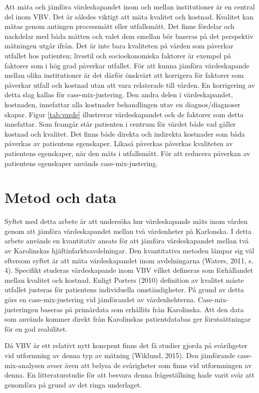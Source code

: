 Att mäta och jämföra värdeskapandet inom och mellan institutioner är en central del inom VBV. Det är således viktigt att mäta kvalitet och kostnad. Kvalitet kan mätas genom antingen processmått eller utfallsmått. Det finns fördelar och nackdelar med båda måtten och valet dem emellan bör baseras på det perspektiv mätningen utgår ifrån. Det är inte bara kvaliteten på vården som påverkar utfallet hos patienten; livsstil och socioekonomiska faktorer är exempel på faktorer som i hög grad påverkar utfallet. För att kunna jämföra värdeskapande mellan olika institutioner är det därför önskvärt att korrigera för faktorer som påverkar utfall och kostnad utan att vara relaterade till vården. En korrigering av detta slag kallas för case-mix-justering. Den andra delen i värdeskapandet, kostnaden, innefattar alla kostnader behandlingen utav en diagnos/diagnoser skapar. Figur \ref{tab:varde} illustrerar värdeskapandet och de faktorer som detta innefattar. Som framgår står patienten i centrum för värdet både vad gäller kostnad och kvalitet. Det finns både direkta och indirekta kostnader som båda påverkas av patientens egenskaper. Likaså påverkas påverkas kvaliteten av patientens egenskaper, när den mäts i utfallsmått. För att reducera påverkan av patientens egenskaper används case-mix-justering.


\section{Metod och data}

Syftet med detta arbete är att undersöka hur värdeskapande mäts inom vården genom att jämföra värdeskapandet mellan två vårdenheter på Karlonska. I detta arbete används en kvantitativ ansats för att jämföra värdeskapandet mellan två av Karolinskas hjäftinfarktsavdelningar. Den kvantitativa metoden lämpar sig väl eftersom syftet är att mäta värdeskapandet inom avdelningarna (Waters, 2011, s. 4).    Specifikt studeras värdeskapande inom VBV vilket defineras som förhållandet mellan kvalitet och kostnad. 
Enligt Porters (2010) definition av kvalitet måste utfallet justeras för patientens individuella omständigheter. På grund av detta görs en case-mix-justering vid jämförandet av vårdenhehterna. Case-mix-justeringen baseras på primärdata som erhållits från Karolinska. Att den data som används kommer direkt från Karolinskas patientdatabas ger förutsättningar för en god reabilitet.

Då VBV är ett relativt nytt koncpent finns det få studier gjorda på svårihgeter vid utformning av denna typ av mätning (Wiklund, 2015). Den jämförande case-mix-analysen avser även att belysa de svårigheter som finns vid utformningen av denna. En litteraturstudie för att besvara denna frågeställning hade varit svår att genomföra på grund av det ringa underlaget. 

